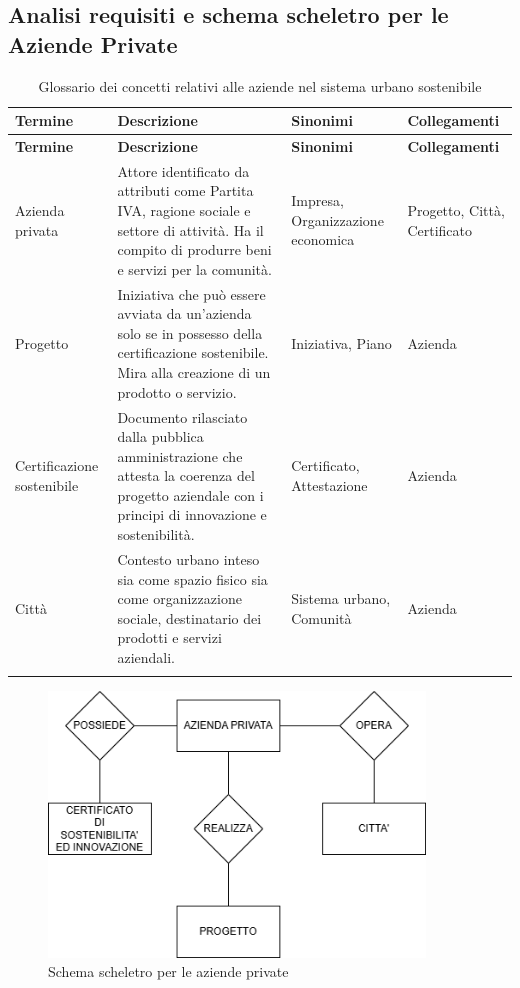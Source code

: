 \documentclass{article}
\begin{document}

\newpage
\subsection{Analisi requisiti e schema scheletro per le Aziende Private}

\begin{longtable}{|p{3cm}|p{6.5cm}|p{2.5cm}|p{3cm}|}
\hline
\textbf{Termine} & \textbf{Descrizione} & \textbf{Sinonimi} & \textbf{Collegamenti} \\
\hline
\endfirsthead

\hline
\textbf{Termine} & \textbf{Descrizione} & \textbf{Sinonimi} & \textbf{Collegamenti} \\
\hline
\endhead

Azienda privata & Attore identificato da attributi come Partita IVA, ragione sociale e settore di attività. Ha il compito di produrre beni e servizi per la comunità. & Impresa, Organizzazione economica & Progetto, Città, Certificato \\
\hline

Progetto & Iniziativa che può essere avviata da un’azienda solo se in possesso della certificazione sostenibile. Mira alla creazione di un prodotto o servizio. & Iniziativa, Piano & Azienda \\
\hline

Certificazione sostenibile & Documento rilasciato dalla pubblica amministrazione che attesta la coerenza del progetto aziendale con i principi di innovazione e sostenibilità. & Certificato, Attestazione & Azienda \\
\hline

Città & Contesto urbano inteso sia come spazio fisico sia come organizzazione sociale, destinatario dei prodotti e servizi aziendali. & Sistema urbano, Comunità & Azienda \\
\hline

\caption{Glossario dei concetti relativi alle aziende nel sistema urbano sostenibile}
\label{tab:glossario-aziende}
\end{longtable}

\begin{figure}[H]
    \centering
    \includegraphics[width=10cm]{images/SCHEMA_SCHELETRO_AZIENDA.drawio.png}
    \caption{Schema scheletro per le aziende private}
    \label{fig:schema-sostenibilita2}
\end{figure}
\end{document}
